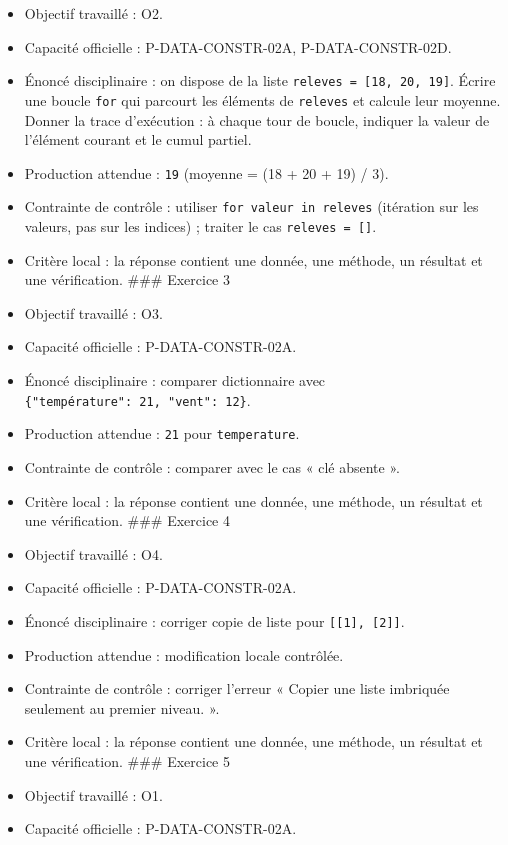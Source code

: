 \begin{itemize}
\item
  Objectif travaillé : O2.
\item
  Capacité officielle : P-DATA-CONSTR-02A, P-DATA-CONSTR-02D.
\item
  Énoncé disciplinaire : on dispose de la liste
  \texttt{releves\ =\ {[}18,\ 20,\ 19{]}}. Écrire une boucle
  \texttt{for} qui parcourt les éléments de \texttt{releves} et calcule
  leur moyenne. Donner la trace d'exécution : à chaque tour de boucle,
  indiquer la valeur de l'élément courant et le cumul partiel.
\item
  Production attendue : \texttt{19} (moyenne = (18 + 20 + 19) / 3).
\item
  Contrainte de contrôle : utiliser \texttt{for\ valeur\ in\ releves}
  (itération sur les valeurs, pas sur les indices) ; traiter le cas
  \texttt{releves\ =\ {[}{]}}.
\item
  Critère local : la réponse contient une donnée, une méthode, un
  résultat et une vérification. \#\#\# Exercice 3
\item
  Objectif travaillé : O3.
\item
  Capacité officielle : P-DATA-CONSTR-02A.
\item
  Énoncé disciplinaire : comparer dictionnaire avec
  \texttt{\{"température":\ 21,\ "vent":\ 12\}}.
\item
  Production attendue : \texttt{21} pour \texttt{temperature}.
\item
  Contrainte de contrôle : comparer avec le cas « clé absente ».
\item
  Critère local : la réponse contient une donnée, une méthode, un
  résultat et une vérification. \#\#\# Exercice 4
\item
  Objectif travaillé : O4.
\item
  Capacité officielle : P-DATA-CONSTR-02A.
\item
  Énoncé disciplinaire : corriger copie de liste pour
  \texttt{{[}{[}1{]},\ {[}2{]}{]}}.
\item
  Production attendue : modification locale contrôlée.
\item
  Contrainte de contrôle : corriger l'erreur « Copier une liste
  imbriquée seulement au premier niveau. ».
\item
  Critère local : la réponse contient une donnée, une méthode, un
  résultat et une vérification. \#\#\# Exercice 5
\item
  Objectif travaillé : O1.
\item
  Capacité officielle : P-DATA-CONSTR-02A.

\end{itemize}
